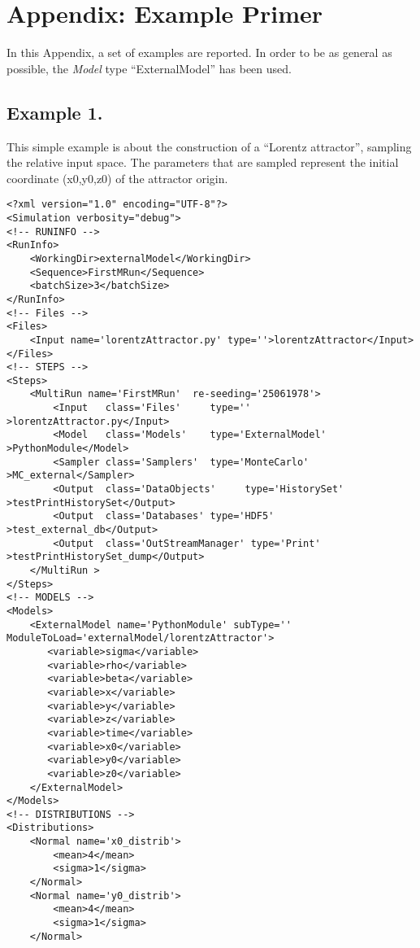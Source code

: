 \appendix
\section{Appendix: Example Primer}
\label{sec:examplePrimer}
In this Appendix, a set of examples are reported. In order to be as general as possible, the \textit{Model} type ``ExternalModel'' has been used.
\subsection{Example 1.}
\label{subsec:ex1}
This simple example is about the construction of a ``Lorentz attractor'', sampling the relative input space. The parameters that are sampled represent the initial coordinate (x0,y0,z0) of the attractor origin. 

\begin{lstlisting}[style=XML,morekeywords={debug,re,seeding,class,subType,limit}]
<?xml version="1.0" encoding="UTF-8"?>
<Simulation verbosity="debug">
<!-- RUNINFO -->
<RunInfo>
    <WorkingDir>externalModel</WorkingDir>
    <Sequence>FirstMRun</Sequence>
    <batchSize>3</batchSize>
</RunInfo>
<!-- Files -->
<Files>
    <Input name='lorentzAttractor.py' type=''>lorentzAttractor</Input>
</Files>
<!-- STEPS -->
<Steps>
    <MultiRun name='FirstMRun'  re-seeding='25061978'>
        <Input   class='Files'     type=''               >lorentzAttractor.py</Input>
        <Model   class='Models'    type='ExternalModel'  >PythonModule</Model>
        <Sampler class='Samplers'  type='MonteCarlo'     >MC_external</Sampler>
        <Output  class='DataObjects'     type='HistorySet'      >testPrintHistorySet</Output>
        <Output  class='Databases' type='HDF5'           >test_external_db</Output>
        <Output  class='OutStreamManager' type='Print'   >testPrintHistorySet_dump</Output>
    </MultiRun >
</Steps>
<!-- MODELS -->
<Models>
    <ExternalModel name='PythonModule' subType='' ModuleToLoad='externalModel/lorentzAttractor'>  
       <variable>sigma</variable>
       <variable>rho</variable>
       <variable>beta</variable>
       <variable>x</variable>
       <variable>y</variable>
       <variable>z</variable>
       <variable>time</variable>
       <variable>x0</variable>
       <variable>y0</variable>
       <variable>z0</variable>
    </ExternalModel>
</Models>
<!-- DISTRIBUTIONS -->
<Distributions>
    <Normal name='x0_distrib'>
        <mean>4</mean>
        <sigma>1</sigma>
    </Normal>
    <Normal name='y0_distrib'>
        <mean>4</mean>
        <sigma>1</sigma>
    </Normal>

\end{lstlisting}
